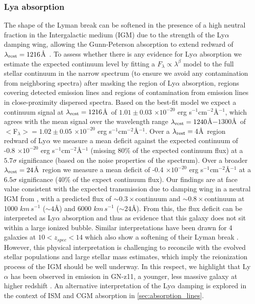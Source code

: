 \documentclass[sn-mathphys]{sn-jnl}%
\theoremstyle{thmstyleone}%
\theoremstyle{thmstyletwo}%
\theoremstyle{thmstylethree}%
\begin{document}
\subsubsection{Lya absorption}\label{sec:lyman_break}
The shape of the Lyman break can be softened in the presence of a high neutral fraction in the Intergalactic medium (IGM) due to the strength of the Ly$\alpha$ damping wing, allowing the Gunn-Peterson absorption to extend redward of $\lambda_{\rm rest}=1216$\AA\ \citep{Miralda_escude98}. 
To assess whether there is any evidence for Ly$\alpha$ absorption we
estimate the expected continuum level by fitting a $F_\lambda \propto \lambda^\beta$ model to the full stellar continuum in the narrow spectrum (to ensure we avoid any contamination from neighboring spectra) after masking the region of Ly$\alpha$ absorption, regions covering detected emission lines and regions of contamination from emission lines in close-proximity dispersed spectra. Based on the best-fit model we expect a continuum signal at $\lambda_{\rm rest}=1216$\AA\ of $1.01\pm0.03$ $\times10^{-20}$ erg s$^{-1} $cm$^{-2}$\AA$^{-1}$, which agrees with the mean signal over the wavelength range $\lambda_{\rm rest} =1240$\AA$-1300$\AA\ of $<$F$_\lambda > = 1.02\pm0.05$ $\times10^{-20}$ erg s$^{-1} $cm$^{-2}$\AA$^{-1}$. Over a $\lambda_{\rm rest}=4$\AA\ region redward of Ly$\alpha$ we measure a mean deficit against the expected continuum of -0.8 $\times10^{-20}$ erg s$^{-1} $cm$^{-2}$\AA$^{-1}$ (missing 80$\%$ of the expected continuum flux) at a $5.7\sigma$ significance (based on the noise properties of the spectrum). Over a broader $\lambda_{\rm rest}=24$\AA\ region we measure a mean deficit of -0.4 $\times10^{-20}$ erg s$^{-1} $cm$^{-2}$\AA$^{-1}$ at a $6.5\sigma$ significance (40$\%$ of the expect continuum flux).
Our findings are at face value consistent with the expected transmission due to damping wing in a neutral IGM from \cite{Mason20}, with a predicted flux of $\sim0.3\times$continuum and $\sim0.8\times$continuum at 1000 $km\,s^{-1}$ ($\sim4$\AA) and 6000 $km\,s^{-1}$ ($\sim24$\AA).
From this, the flux deficit can be interpreted as Ly$\alpha$ absorption and thus as evidence that this galaxy does not sit within a large ionized bubble. Similar interpretations have been drawn for 4 galaxies at $10<z_{spec}<14$ which also show a softening of their Lyman break \citep{Curtis-lake22}. However, this physical interpretation is challenging to reconcile with the evolved stellar populations and large stellar mass estimates, which imply the reionization process of the IGM should be well underway. In this respect, we highlight that Ly$\alpha$ has been observed in emission in GN-z11, a younger, less massive galaxy at higher redshift \cite{Bunker23}. An alternative interpretation of the Ly$\alpha$ damping is explored in the context of ISM and CGM absorption in \ref{sec:absorption_lines}. 
\end{document}
